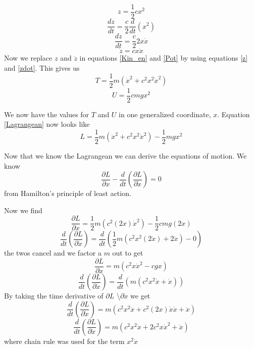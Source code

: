 \documentclass[11pt]{article}
\numberwithin{equation}{section}
\begin{document}
\begin{equation}
z = \frac{1}{2}cx^2
\label{z}
\end{equation}
$$\frac{dz}{dt} = \frac{c}{2}\frac{d}{dt}(x^2)$$
$$\frac{dz}{dt} = \frac{c}{2} 2 x \dot{x}$$
\begin{equation}
\dot{z} = c x \dot{x}
\label{zdot}
\end{equation}
Now we replace $z$ and $\dot{z}$ in equations \ref{Kin_en} and \ref{Pot} by using equations \ref{z} and \ref{zdot}. This gives us
$$T = \frac{1}{2}m(\dot{x}^2 + c^2 x^2\dot{x}^2)$$
$$U = \frac{1}{2}cmgx^2$$

We now have the values for $T$ and $U$ in one generalized coordinate, $x$. Equation \ref{Lagrangean} now looks like
$$L = \frac{1}{2}m(\dot{x}^2 + c^2x^2\dot{x}^2) - \frac{1}{2}mgx^2$$

Now that we know the Lagrangean we can derive the equations of motion. We know
\begin{equation}
\frac{\partial L}{\partial x} - \frac{d}{dt}\left(\frac{\partial L}{\partial \dot{x}}\right) = 0
\label{Ham}
\end{equation}
from Hamilton's principle of least action.

Now we find
$$\frac{\partial L}{\partial x} = \frac{1}{2}m(c^2(2x)\dot{x}^2) - \frac{1}{2}cmg(2x)$$
$$\frac{d}{dt}\left(\frac{\partial L}{\partial \dot{x}}\right) = \frac{d}{dt}\left(\frac{1}{2}m(c^2x^2(2\dot{x}) + 2\dot{x}) - 0\right)$$
the twos cancel and we factor a $m$ out to get
\begin{equation}
\frac{\partial L}{\partial x} = m(c^2x\dot{x}^2 - cgx)
\label{dldx}
\end{equation}
$$\frac{d}{dt}\left(\frac{\partial L}{\partial \dot{x}} \right)= \frac{d}{dt}\left(m(c^2x^2\dot{x} + \dot{x})\right)$$
By taking the time derivative of $\partial L$ \textbackslash $\partial \dot{x}$ we get
$$\frac{d}{dt}\left(\frac{\partial L}{\partial \dot{x}} \right)= m(c^2x^2\ddot{x} + c^2(2x)\dot{x}\dot{x} + \ddot{x})$$
\begin{equation}
\frac{d}{dt}\left(\frac{\partial L}{\partial \dot{x}} \right)= m(c^2x^2\ddot{x} + 2c^2x\dot{x}^2 + \ddot{x})
\label{ddtdldx}
\end{equation}
where chain rule was used for the term $x^2\dot{x}$
\end{document}
